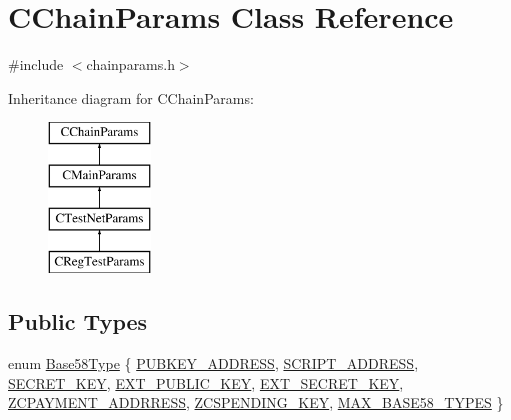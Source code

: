 \hypertarget{class_c_chain_params}{}\section{C\+Chain\+Params Class Reference}
\label{class_c_chain_params}


{\ttfamily \#include $<$chainparams.\+h$>$}

Inheritance diagram for C\+Chain\+Params\+:\begin{figure}[H]
\begin{center}
\leavevmode
\includegraphics[height=4.000000cm]{class_c_chain_params}
\end{center}
\end{figure}
\subsection*{Public Types}
\begin{DoxyCompactItemize}
\item 
enum \mbox{\hyperlink{class_c_chain_params_aa294058ec2e3586bd8d03d6c39667058}{Base58\+Type}} \{ \newline
\mbox{\hyperlink{class_c_chain_params_aa294058ec2e3586bd8d03d6c39667058af088724f20c49c73e548f94d8f1808dd}{P\+U\+B\+K\+E\+Y\+\_\+\+A\+D\+D\+R\+E\+SS}}, 
\mbox{\hyperlink{class_c_chain_params_aa294058ec2e3586bd8d03d6c39667058adf0172df56140eb2f6fb7a59df0bb76a}{S\+C\+R\+I\+P\+T\+\_\+\+A\+D\+D\+R\+E\+SS}}, 
\mbox{\hyperlink{class_c_chain_params_aa294058ec2e3586bd8d03d6c39667058aacf95cbb9b5f51445295c704540adb18}{S\+E\+C\+R\+E\+T\+\_\+\+K\+EY}}, 
\mbox{\hyperlink{class_c_chain_params_aa294058ec2e3586bd8d03d6c39667058a1259eb07831c689e393e5008d7bd0085}{E\+X\+T\+\_\+\+P\+U\+B\+L\+I\+C\+\_\+\+K\+EY}}, 
\newline
\mbox{\hyperlink{class_c_chain_params_aa294058ec2e3586bd8d03d6c39667058ab5636e60152f35f6595fe413eae430b0}{E\+X\+T\+\_\+\+S\+E\+C\+R\+E\+T\+\_\+\+K\+EY}}, 
\mbox{\hyperlink{class_c_chain_params_aa294058ec2e3586bd8d03d6c39667058abeb8eb84b47b2483fbe4f13605bd1ccf}{Z\+C\+P\+A\+Y\+M\+E\+N\+T\+\_\+\+A\+D\+D\+R\+R\+E\+SS}}, 
\mbox{\hyperlink{class_c_chain_params_aa294058ec2e3586bd8d03d6c39667058af77179f15bba300f536da7f3198cf6e5}{Z\+C\+S\+P\+E\+N\+D\+I\+N\+G\+\_\+\+K\+EY}}, 
\mbox{\hyperlink{class_c_chain_params_aa294058ec2e3586bd8d03d6c39667058a6b21a525c7fab64a5df656e708f71a98}{M\+A\+X\+\_\+\+B\+A\+S\+E58\+\_\+\+T\+Y\+P\+ES}}
 \}
\end{DoxyCompactItemize}
